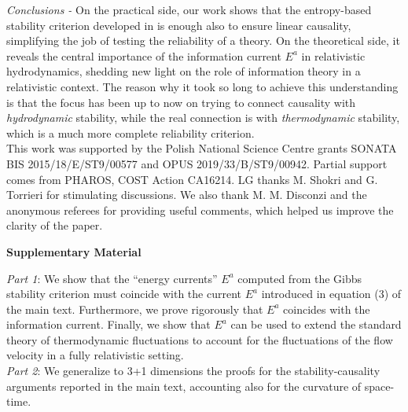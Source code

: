 \documentclass[aps,prl,reprint,nofootinbib]{revtex4-1}
\makeatletter
\renewcommand\onecolumngrid{%
\do@columngrid{one}{\@ne}%
\def\set@footnotewidth{\onecolumngrid}%
\def\footnoterule{\kern-6pt\hrule width 1.5in\kern6pt}%
}
\makeatother
\begin{document}
\textit{Conclusions -} On the practical side, our work shows that the entropy-based stability criterion developed in \cite{GavassinoGibbs2021} is enough also to ensure linear causality, simplifying the job of testing the reliability of a theory. On the theoretical side, it reveals the central importance of the information current $E^a$ in relativistic hydrodynamics, shedding new light on the role of information theory in a relativistic context. The reason why it took so long to achieve this understanding is that the focus has been up to now on trying to connect causality with \textit{hydrodynamic} stability, while the real connection is with \textit{thermodynamic} stability, which is a much more complete reliability criterion. \\



This work was supported by the Polish National Science Centre grants SONATA BIS 2015/18/E/ST9/00577 and OPUS 2019/33/B/ST9/00942. Partial support comes from PHAROS, COST Action CA16214. LG thanks M. Shokri and G. Torrieri for stimulating discussions. We also thank M. M. Disconzi and the anonymous referees for providing useful comments, which helped us improve the clarity of the paper.








\onecolumngrid



\begin{center}
\Large \bf Supplementary Material
\end{center}

\hspace{2cm}

\hspace{2cm}


\textit{Part 1}: We show that the ``energy currents'' $E^a$ computed from the Gibbs stability criterion \cite{GavassinoGibbs2021} must coincide with the current $E^a$ introduced in equation (3) of the main text. Furthermore, we prove rigorously that $E^a$ coincides with the information current. Finally, we show that $E^a$ can be used to extend the standard theory of thermodynamic fluctuations to account for the fluctuations of the flow velocity in a fully relativistic setting.\\

\textit{Part 2}: We generalize to 3+1 dimensions the proofs for the stability-causality arguments reported in the main text, accounting also for the curvature of space-time.
 
\end{document}
